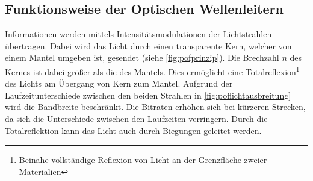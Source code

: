\subsection{Funktionsweise der Optischen Wellenleitern}
\label{subsec:poffunktionsweise}

Informationen werden mittels Intensitätsmodulationen der Lichtstrahlen
übertragen. Dabei wird das Licht durch einen transparente Kern, welcher von
einem Mantel umgeben ist, gesendet (siehe \autoref{fig:pofprinzip}). Die
Brechzahl $n$ des Kernes ist dabei größer als die des Mantels. Dies ermöglicht
eine Totalreflexion\footnote{Beinahe vollständige Reflexion von Licht an der
Grenzfläche zweier Materialien} des Lichts am Übergang von Kern zum Mantel.
Aufgrund der Laufzeitunterschiede zwischen den beiden Strahlen in
\autoref{fig:poflichtausbreitung} wird die Bandbreite beschränkt. Die Bitraten
erhöhen sich bei kürzeren Strecken, da sich die Unterschiede zwischen den
Laufzeiten verringern. Durch die Totalreflektion kann das Licht auch durch
Biegungen geleitet werden.

